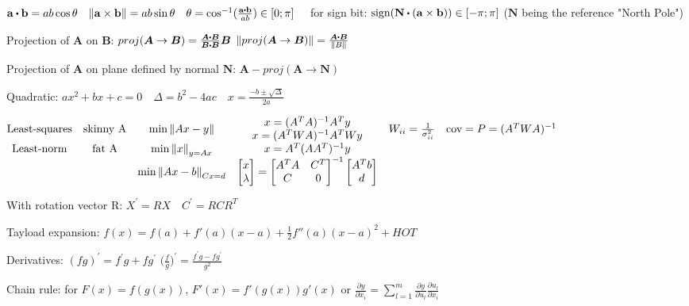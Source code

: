 \documentclass[11pt,landscape]{article}
\begin{document}
$
\mathbf{a} \dotp \mathbf{b} = a b \cos{\theta}
\quad
\lVert \mathbf{a} \times \mathbf{b} \rVert = a b \sin{\theta}
\quad
\theta = \cos^{-1}({\frac{\mathbf{a} \dotp \mathbf{b}}{ab}}) \in [0; \pi]
\quad
$
for sign bit:
$
\text{sign}( \mathbf{N} \dotp (\mathbf{a} \times \mathbf{b})) \in [-\pi; \pi]
$
($\mathbf{N}$ being the reference "North Pole")

Projection of $\bm A$ on $\bm B$:
$proj(\bm A \rightarrow \bm B) = \frac{\bm A \dotp \bm B}{\bm B \dotp \bm B} \bm B$
\quad
$\norm{proj(\bm A \rightarrow \bm B)} = \frac{\bm A \dotp \bm B}{\norm{B}}$

Projection of $\bm A$ on plane defined by normal $\bm N$:
$\bm A - proj(\bm A \rightarrow \bm N)$

Quadratic:
$
ax^2 + bx + c = 0
\quad
\Delta = b^2 - 4ac
\quad
x = \frac{-b \pm \sqrt{\Delta}}{2a}
$

$
\begin{matrix}
\text{Least-squares} & \text{skinny A} & \text{min} \left\lVert Ax-y \right\rVert & 
	\begin{matrix} x = (A^TA)^{-1}A^Ty \\ x = (A^TWA)^{-1}A^TWy \end{matrix} &
	W_{ii}=\frac{1}{\sigma_{ii}^2} \quad \text{cov} = P = (A^TWA)^{-1} \\
\text{Least-norm} & \text{fat A} & \text{min} \left\lVert x \right\rVert_{y=Ax} & x = A^T(AA^T)^{-1}y \\
	&  & \text{min}\left\lVert Ax-b \right\rVert_{Cx=d} & 
	\begin{bmatrix} x \\ \lambda \end{bmatrix} =
	\begin{bmatrix} A^TA & C^T \\ C & 0 \end{bmatrix}^{-1}
	\begin{bmatrix} A^Tb \\ d \end{bmatrix}
\end{matrix}
$

With rotation vector R:
$X^\prime = RX \quad C^\prime = RCR^T$

Tayload expansion:
$
f(x) = f(a) + f'(a)(x-a) + \frac{1}{2}f''(a)(x-a)^2 + HOT
$

Derivatives:
$(fg)^\prime = f^\prime g + fg^\prime$
\quad
$\big( \frac{f}{g} \big)^\prime = \frac{f^\prime g - fg^\prime}{g^2}$

Chain rule: for $F(x)=f(g(x))$, $F'(x)=f'(g(x))g'(x)$
or $\frac{\partial y}{\partial x_i} = 
\sum_{l=1}^{m} \frac{\partial y}{\partial u_l}\frac{\partial u_l}{\partial x_i}$
\end{document}
